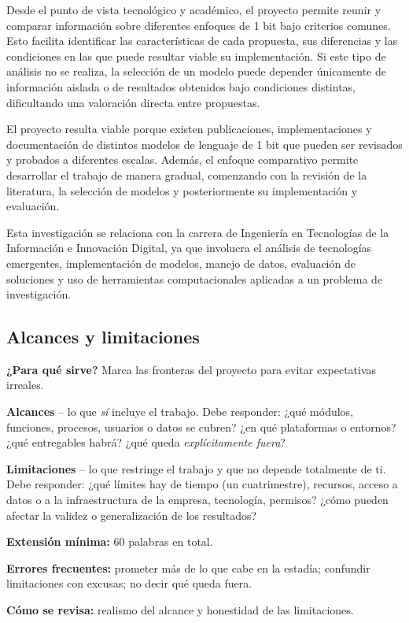 Desde el punto de vista tecnológico y académico, el proyecto permite reunir y comparar información sobre diferentes enfoques de 1 bit bajo criterios comunes. Esto facilita identificar las características de cada propuesta, sus diferencias y las condiciones en las que puede resultar viable su implementación. Si este tipo de análisis no se realiza, la selección de un modelo puede depender únicamente de información aislada o de resultados obtenidos bajo condiciones distintas, dificultando una valoración directa entre propuestas.

El proyecto resulta viable porque existen publicaciones, implementaciones y documentación de distintos modelos de lenguaje de 1 bit que pueden ser revisados y probados a diferentes escalas. Además, el enfoque comparativo permite desarrollar el trabajo de manera gradual, comenzando con la revisión de la literatura, la selección de modelos y posteriormente su implementación y evaluación.

Esta investigación se relaciona con la carrera de Ingeniería en Tecnologías de la Información e Innovación Digital, ya que involucra el análisis de tecnologías emergentes, implementación de modelos, manejo de datos, evaluación de soluciones y uso de herramientas computacionales aplicadas a un problema de investigación.

\subsection{Alcances y limitaciones} \label{sec:alcances_limitaciones} %

\begin{guia}
\textbf{¿Para qué sirve?} Marca las fronteras del proyecto para evitar expectativas irreales.

\textbf{Alcances} -- lo que \emph{sí} incluye el trabajo. Debe responder: ¿qué módulos, funciones, procesos, usuarios o
datos se cubren? ¿en qué plataformas o entornos? ¿qué entregables habrá? ¿qué queda \emph{explícitamente fuera}?

\textbf{Limitaciones} -- lo que restringe el trabajo y que no depende totalmente de ti. Debe responder: ¿qué límites hay
de tiempo (un cuatrimestre), recursos, acceso a datos o a la infraestructura de la empresa, tecnología, permisos?
¿cómo pueden afectar la validez o generalización de los resultados?

\textbf{Extensión mínima:} 60 palabras en total.

\textbf{Errores frecuentes:} prometer más de lo que cabe en la estadía; confundir limitaciones con excusas; no decir qué
queda fuera.

\textbf{Cómo se revisa:} realismo del alcance y honestidad de las limitaciones.
\end{guia}

